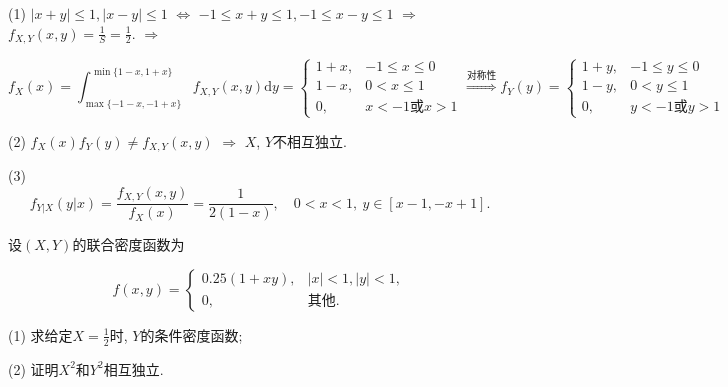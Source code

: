 \documentclass[standard]{ExBook}
\begin{document}
\begin{qitems}
\begin{bbox}
(1) $|x+y|\leq1,|x-y|\leq1$ $\Longleftrightarrow$ $-1\leq x+y\leq1,-1\leq x-y\leq1$ $\Longrightarrow$ $f_{X,Y}(x,y)=\frac{1}{S}=\frac{1}{2}.$ $\Longrightarrow$
\vspace{-2em}
\begin{center}
\begin{equation}
    f_{X}(x)=\int_{\max\{-1-x,-1+x\}}^{\min\{1-x,1+x\}}f_{X,Y}(x,y)\mathrm{d}y=
    \left\{
    \begin{array}{cl}
        \nonumber
        1+x, &-1\leq x\leq0\\
        1-x, &0< x\leq1\\
        0, &x<-1\text{或}x>1
    \end{array}
    \right.
    \overset{\text{对称性}}{\Longrightarrow}
    f_{Y}(y)=
    \left\{
    \begin{array}{cl}
        \nonumber
        1+y, &-1\leq y\leq0\\
        1-y, &0< y\leq1\\
        0, &y<-1\text{或}y>1
    \end{array}
    \right.
\end{equation}
\end{center}
(2) $f_{X}(x)f_{Y}(y)\neq f_{X,Y}(x,y)$ $\Longrightarrow$ $X$, $Y$不相互独立.

(3) $$f_{Y|X}(y|x)=\frac{f_{X,Y}(x,y)}{f_{X}(x)}=\frac{1}{2(1-x)},\quad 0<x<1,\ y\in[x-1,-x+1].$$
    \end{bbox}

\vspace{-5em}

    \begin{bbox}
    \begin{shaded}
        \qitem
设$(X,Y)$的联合密度函数为
\vspace{-2em}
\begin{center}
\begin{equation}
    f(x,y)=
    \left\{
    \begin{array}{cl}
        \nonumber
        0.25(1+xy), &|x|<1,|y|<1,\\
        0, & \text{其他}.
    \end{array}
    \right.
\end{equation}
\end{center}
(1) 求给定$X=\displaystyle\frac{1}{2}$时, $Y$的条件密度函数;

(2) 证明$X^2$和$Y^2$相互独立.
    \end{shaded}
    \end{bbox}


\end{qitems}
\end{document}
